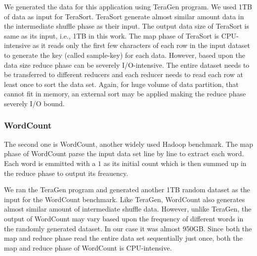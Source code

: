 \documentclass[journal]{IEEEtran}
\begin{document}
We generated the data for this application using TeraGen program. We used 1TB of data  as input for TeraSort. TeraSort generate almost similar amount data in the intermediate shuffle phase as their input. The output data size of TeraSort is same as its input, i.e., 1TB in this work. The map phase of TeraSort is CPU-intensive as it reads only the first few characters of each row in the input dataset to generate the key (called sample-key) for each data. However, based upon the data size reduce phase can be severely I/O-intensive. The entire dataset needs to be transferred to different reducers and each reducer needs to read each row at least once to sort the data set. Again, for huge volume of data partition, that cannot fit in memory, an external sort may be applied making the reduce phase severely I/O bound.  

\subsubsection{WordCount}
The second one is WordCount, another widely used Hadoop benchmark. The map phase of WordCount parse the input data set line by line to extract each word. Each word is emmitted with a $1$ as its initial count which is then summed up in the reduce phase to output its  freauency. 

We ran the TeraGen program and generated another 1TB random dataset as the input for the WordCount benchmark. Like TeraGen, WordCount also generates almost similar amount of intermediate shuffle data. However, unlike TeraGen, the output of WordCount may vary based upon the frequency of different words in the randomly generated dataset. In our case it was almost 950GB.
Since both the map and reduce phase read the entire data set sequentially just once, both the map and reduce phase of WordCount is CPU-intensive. 
\end{document}

